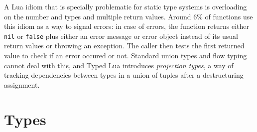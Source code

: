 \documentclass{sigplanconf}
\begin{document}
A Lua idiom that is specially problematic for static type
systems is overloading on the number and types and
multiple return values. Around 6\% of functions use
this idiom as a way to signal errors: in case of errors,
the function returns either {\tt nil} or {\tt false} plus
either an error message or error object instead of its usual
return values or throwing an exception. The caller then
tests the first returned value to check if an error occured
or not. Standard union types and flow typing cannot deal
with this, and Typed Lua introduces {\em projection types},
a way of tracking dependencies between types in a union of
tuples after a destructuring assignment.

\section{Types}
\label{sec:types}
\end{document}
